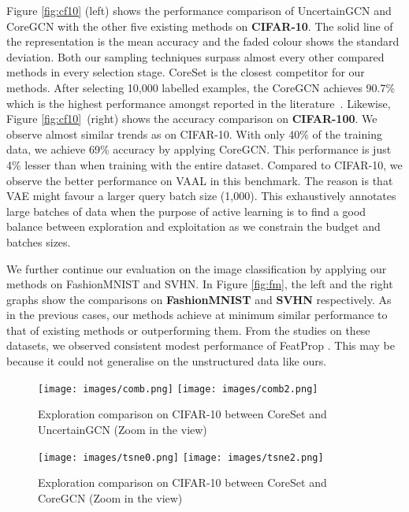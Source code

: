 Figure \ref{fig:cf10} (left) shows the performance comparison of UncertainGCN and CoreGCN 
with the other five existing methods on \textbf{CIFAR-10}. The solid line of the representation 
is the mean accuracy and the faded colour shows the
standard deviation. Both our sampling techniques surpass almost every other compared methods in every selection stage.
CoreSet is the closest competitor for our methods. After selecting 10,000 labelled examples, 
the CoreGCN achieves 90.7\% which is the highest performance amongst reported in the literature~\cite{Yoo2019LearningLearning,Sinha2019VariationalLearning}. 
Likewise, Figure \ref{fig:cf10}~(right) shows the accuracy comparison on \textbf{CIFAR-100}. 
We observe almost similar trends as on CIFAR-10.  
With only 40\% of the training data, we achieve 69\% accuracy by applying CoreGCN.
This performance is just 4\% lesser than when training with the entire dataset. 
Compared to CIFAR-10, we observe the better performance on VAAL 
in this benchmark.
The reason is that VAE might favour a larger query batch size (1,000).
This exhaustively annotates large batches of data when the purpose of active learning 
is to find a good balance between exploration and exploitation as we constrain
the budget and batches sizes.


We further continue our evaluation on the image classification by applying our methods on 
FashionMNIST and SVHN. In Figure \ref{fig:fm}, the left and the right graphs show the comparisons on
\textbf{FashionMNIST} and \textbf{SVHN} respectively. As in the previous cases, our methods achieve at minimum 
similar performance to that of existing methods or outperforming them.
From the studies on these datasets, we observed consistent modest performance of FeatProp \cite{Wu2019ActivePropagation}.
This may be because it could not generalise on the unstructured 
data like ours.
\begin{figure}
    \centering
    \texttt{[image: images/comb.png]}
    \texttt{[image: images/comb2.png]}
\caption{Exploration comparison on CIFAR-10 between CoreSet and UncertainGCN (Zoom in the view)}
    \label{fig:tsne}
\end{figure}

\begin{figure}
    \centering
    \texttt{[image: images/tsne0.png]}
    \texttt{[image: images/tsne2.png]}
\caption{Exploration comparison on CIFAR-10 between CoreSet and CoreGCN (Zoom in the view)}
    \label{fig:tsne_compare_coreset}
\end{figure}

